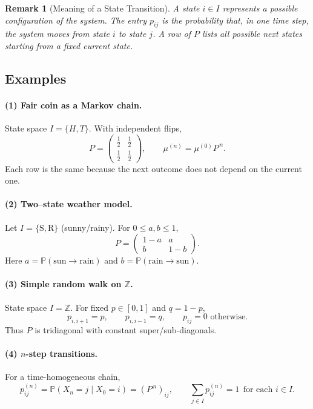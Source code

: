 \documentclass[10pt, oneside]{article}
\newenvironment{remarkbox}[1][]{\begin{rembox}\begin{rem}[#1]}{\end{rem}\end{rembox}}
\numberwithin{equation}{section}
\newtheorem{rem}{Remark}
\begin{document}
\begin{remarkbox}[Meaning of a State Transition]
A \emph{state} $i\in I$ represents a possible configuration of the system.
The entry $p_{ij}$ is the probability that, in one time step, the system
moves from state $i$ to state $j$. A row of $P$ lists all possible next states
starting from a fixed current state.
\end{remarkbox}

\subsection*{Examples}

\paragraph{(1) Fair coin as a Markov chain.}
State space $I=\{H,T\}$. With independent flips,
\[
P=\begin{pmatrix}
\frac{1}{2} & \frac{1}{2}\\[4pt]
\frac{1}{2} & \frac{1}{2}
\end{pmatrix},
\qquad
\mu^{(n)}=\mu^{(0)} P^{\,n}.
\]
Each row is the same because the next outcome does not depend on the current one.

\paragraph{(2) Two–state weather model.}
Let $I=\{\mathrm{S},\mathrm{R}\}$ (sunny/rainy). For $0\le a,b\le 1$,
\[
P=\begin{pmatrix}
1-a & a\\
b   & 1-b
\end{pmatrix}.
\]
Here $a=\mathbb{P}(\text{sun}\to\text{rain})$ and $b=\mathbb{P}(\text{rain}\to\text{sun})$.

\paragraph{(3) Simple random walk on $\mathbb{Z}$.}
State space $I=\mathbb{Z}$. For fixed $p\in[0,1]$ and $q=1-p$,
\[
p_{i,i+1}=p,\qquad p_{i,i-1}=q,\qquad p_{ij}=0 \text{ otherwise.}
\]
Thus $P$ is tridiagonal with constant super/sub-diagonals.

\paragraph{(4) $n$-step transitions.}
For a time-homogeneous chain,
\[
p^{(n)}_{ij}=\mathbb{P}(X_n=j\mid X_0=i)=(P^{\,n})_{ij},\qquad
\sum_{j\in I} p^{(n)}_{ij}=1 \ \ \text{for each } i\in I.
\]
\end{document}
